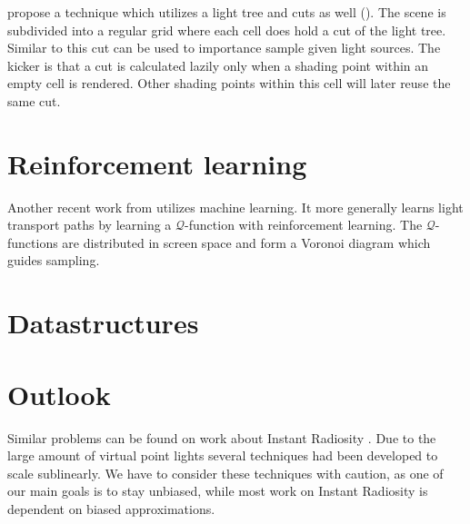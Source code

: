 \parencite{Vevoda} propose a technique which utilizes a light tree and cuts as well (\parencite{Walter2005LightcutsAS}). The scene is subdivided into a regular grid where each cell does hold a cut of the light tree. Similar to \parencite{Estevez} this cut can be used to importance sample given light sources. The kicker is that a cut is calculated lazily only when a shading point within an empty cell is rendered. Other shading points within this cell will later reuse the same cut.

\section{Reinforcement learning}

Another recent work from \parencite{DBLP:journals/corr/DahmK17} utilizes machine learning. It more generally learns light transport paths by learning a $\mathcal{Q}$-function with reinforcement learning. The $\mathcal{Q}$-functions are distributed in screen space and form a Voronoi diagram which guides sampling.


\section{Datastructures}


\section{Outlook}

Similar problems can be found on work about Instant Radiosity \parencite{keller1997instant, Walter2005LightcutsAS, dachsbacher2014scalable}. Due to the large amount of virtual point lights several techniques had been developed to scale sublinearly. We have to consider these techniques with caution, as one of our main goals is to stay unbiased, while most work on Instant Radiosity is dependent on biased approximations.
